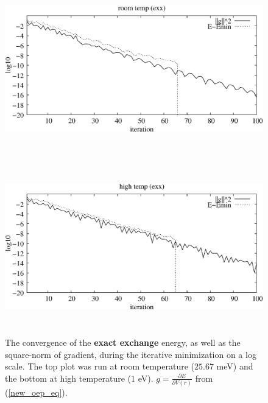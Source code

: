 \documentclass[12pt]{iopart}
\begin{document}
\begin{figure}
\centerline{\includegraphics[height=3in]{cvg_room_exx.eps}}
\centerline{\includegraphics[height=3in]{cvg_1eV_exx.eps}}
\caption{The convergence of the {\bf exact exchange} energy,
as well as the square-norm of gradient,
during the iterative minimization on a log scale.  The top plot
was run at room temperature ($25.67$ meV) and the bottom at
high temperature ($1$ eV).  $g = \frac{\partial E}{\partial V(r)}$ from
(\ref{new_oep_eq}).
}
\label{energy_exx_convergence}
\end{figure}
\end{document}
